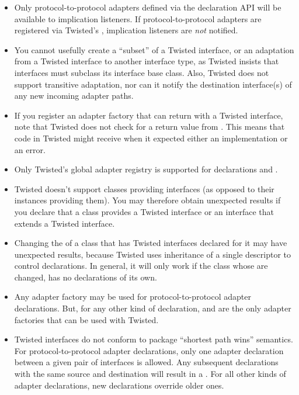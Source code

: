 \begin{verbatim%
}
\begin{verbatim%
}
\begin{verbatim%
}
\begin{verbatim%
}
\begin{verbatim%
}
\begin{verbatim%
}
\begin{itemize}
\item Only protocol-to-protocol adapters defined via the 
declaration API will be available to implication listeners.  If
protocol-to-protocol adapters are registered via Twisted's
, implication listeners are \emph{not} notified.

\item You cannot usefully create a ``subset'' of a Twisted interface, or an
adaptation from a Twisted interface to another interface type, as Twisted
insists that interfaces must subclass its interface base class.  Also, Twisted
does not support transitive adaptation, nor can it notify the destination
interface(s) of any new incoming adapter paths.

\item If you register an adapter factory that can return  with
a Twisted interface, note that Twisted does not check for a  return
value from .  This means that code in Twisted might
receive  when it expected either an implementation or an error.

\item Only Twisted's global adapter registry is supported for declarations and
.

\item Twisted doesn't support classes providing interfaces (as opposed to their
instances providing them).  You may therefore obtain unexpected results if you
declare that a class provides a Twisted interface or an interface that extends a
Twisted interface.

\item Changing the  of a class that has Twisted interfaces
declared for it may have unexpected results, because Twisted uses inheritance of
a single descriptor to control declarations.  In general, it will only work if
the class whose  are changed, has no declarations of its own.



\item Any adapter factory may be used for protocol-to-protocol adapter
declarations.  But, for any other kind of declaration,
 and  are the only
adapter factories that can be used with Twisted.

\item Twisted interfaces do not conform to  package ``shortest
path wins'' semantics.  For protocol-to-protocol adapter declarations, only one
adapter declaration between a given pair of interfaces is allowed.  Any
subsequent declarations with the same source and destination will result in
a .  For all other kinds of adapter declarations, new
declarations override older ones.


\end{itemize}
\end{verbatim%
}
\end{verbatim%
}
\end{verbatim%
}
\end{verbatim%
}
\end{verbatim%
}
\end{verbatim%
}
